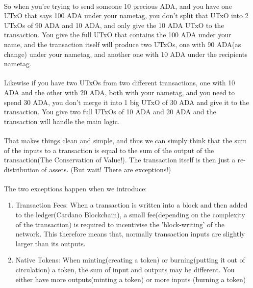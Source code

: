 \documentclass[a4paper, 11pt]{article}
\begin{document}
    \paragraph{}So when you're trying to send someone 10 precious ADA, and you have one UTxO that says 100 ADA under your nametag, you don't split that UTxO into 2 UTxOs of 90 ADA and 10 ADA, and only give the 10 ADA UTxO to the transaction. You give the full UTxO that contains the 100 ADA under your name, and the transaction itself will produce two UTxOs, one with 90 ADA(as change) under your nametag, and another one with 10 ADA under the recipients nametag.

    \paragraph{} Likewise if you have two UTxOs from two different transactions, one with 10 ADA and the other with 20 ADA, both with your nametag, and you need to spend 30 ADA, you don't merge it into 1 big UTxO of 30 ADA and give it to the transaction. You give two full UTxOs of 10 ADA and 20 ADA and the transaction will handle the main logic.

    \paragraph{} That makes things clean and simple, and thus we can simply think that the sum of the inputs to a transaction is equal to the sum of the output of the transaction(The Conservation of Value!).  The transaction itself is then just a re-distribution of assets. (But wait! There are exceptions!)

    \paragraph{} The two exceptions happen when we introduce: 
    
    \begin{enumerate}
        \item Transaction Fees: When a transaction is written into a block and then added to the ledger(Cardano Blockchain), a small fee(depending on the complexity of the transaction) is required to incentivise the 'block-writing' of the network. This therefore means that, normally transaction inputs are slightly larger than its outputs.
        \item Native Tokens: When minting(creating a token) or burning(putting it out of circulation) a token, the sum of input and outputs may be different. You either have more outputs(minting a token) or more inputs (burning a token)
    \end{enumerate}
\end{document}
